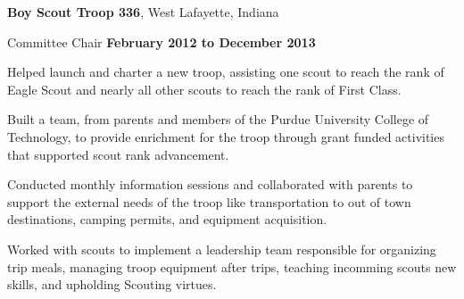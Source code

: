 \documentclass[10pt]{article}
\newcommand{\halfblankline}{\quad\vspace{-0.5\baselineskip}\pagebreak[3]}
\begin{document}
    \halfblankline

    \textbf{Boy Scout Troop 336}, West Lafayette, Indiana
    \begin{outerlist}

        \item[] Committee Chair %
                \hfill \textbf{February 2012 to December 2013}

                \begin{innerlist}
                    \item Helped launch and charter a new troop, assisting one scout to
                          reach the rank of Eagle Scout and nearly all other scouts to reach
                          the rank of First Class.
                    \item Built a team, from parents and members of the Purdue University
                          College of Technology, to provide enrichment for the troop through
                          grant funded activities that supported scout rank advancement.
                    \item Conducted monthly information sessions and
                          collaborated with parents to support the external
                          needs of the troop like transportation to out of
                          town destinations, camping permits, and equipment
                          acquisition.
                    \item Worked with scouts to implement a leadership team
                          responsible for organizing trip meals, managing troop equipment
                          after trips, teaching incomming scouts new skills, and upholding
                          Scouting virtues.
                \end{innerlist}

    \end{outerlist}

    \halfblankline
\end{document}
